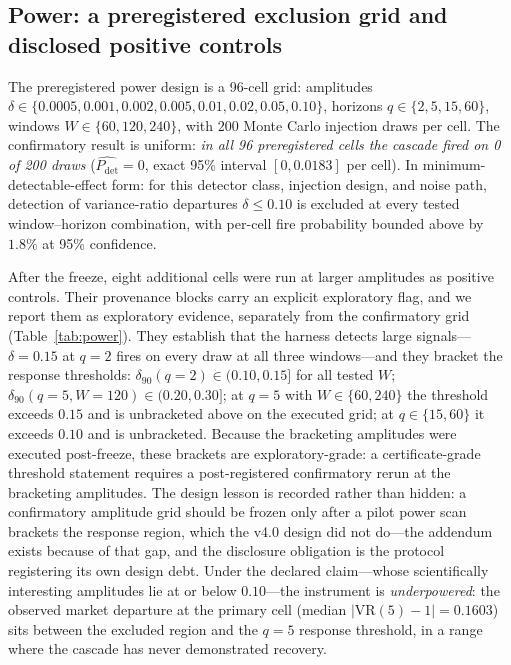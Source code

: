 \documentclass[3p]{elsarticle}
\newcommand{\VR}{\ensuremath{\mathrm{VR}}}
\newcommand{\Pdet}{\ensuremath{P_{\mathrm{det}}}}
\begin{document}
\subsection{Power: a preregistered exclusion grid and disclosed positive controls}
\label{sec:power}

The preregistered power design is a 96-cell grid: amplitudes
$\delta\in\{0.0005,\allowbreak 0.001,\allowbreak 0.002,\allowbreak 0.005,\allowbreak 0.01,\allowbreak 0.02,\allowbreak 0.05,\allowbreak 0.10\}$, horizons
$q\in\{2,5,15,60\}$, windows $W\in\{60,120,240\}$, with $200$ Monte Carlo
injection draws per cell. The confirmatory result is uniform: \emph{in all 96
preregistered cells the cascade fired on 0 of 200 draws}
($\widehat{\Pdet}=0$, exact 95\% interval $[0,0.0183]$ per cell). In
minimum-detectable-effect form: for this detector class, injection design,
and noise path, detection of variance-ratio departures $\delta\le 0.10$ is
excluded at every tested window--horizon combination, with per-cell fire
probability bounded above by $1.8\%$ at 95\% confidence.

After the freeze, eight additional cells were run at larger amplitudes as
positive controls. Their provenance blocks carry an explicit exploratory
flag, and we report them as exploratory evidence, separately from the
confirmatory grid (Table~\ref{tab:power}). They establish that the harness
detects large signals---$\delta=0.15$ at $q{=}2$ fires on every draw at all
three windows---and they bracket the response thresholds:
$\delta_{90}(q{=}2)\in(0.10,0.15]$ for all tested $W$;
$\delta_{90}(q{=}5,W{=}120)\in(0.20,0.30]$; at $q{=}5$ with $W\in\{60,240\}$
the threshold exceeds $0.15$ and is unbracketed above on the executed grid;
at $q\in\{15,60\}$ it exceeds $0.10$ and is unbracketed. Because the
bracketing amplitudes were executed post-freeze, these brackets are
exploratory-grade: a certificate-grade threshold statement requires a
post-registered confirmatory rerun at the bracketing amplitudes. The design
lesson is recorded rather than hidden: a confirmatory amplitude grid should
be frozen only after a pilot power scan brackets the response region, which
the v4.0 design did not do---the addendum exists because of that gap, and the
disclosure obligation is the protocol registering its own design debt. Under
the declared claim---whose scientifically interesting amplitudes lie at or
below $0.10$---the instrument is \emph{underpowered}: the observed market
departure at the primary cell (median $|\VR(5)-1|=0.1603$) sits between the
excluded region and the $q{=}5$ response threshold, in a range where the
cascade has never demonstrated recovery.
\end{document}
